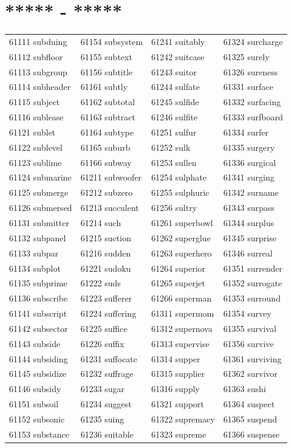 \documentclass[10pt, oneside]{book}
\begin{document}
\begin{table}[h]
	\centering
	\section*{***** - *****}
	\begin{tabular}{l l l l}
61111 subduing &61154 subsystem &61241 suitably &61324 surcharge\\
61112 subfloor &61155 subtext &61242 suitcase &61325 surely\\
61113 subgroup &61156 subtitle &61243 suitor &61326 sureness\\
61114 subheader &61161 subtly &61244 sulfate &61331 surface\\
61115 subject &61162 subtotal &61245 sulfide &61332 surfacing\\
61116 sublease &61163 subtract &61246 sulfite &61333 surfboard\\
61121 sublet &61164 subtype &61251 sulfur &61334 surfer\\
61122 sublevel &61165 suburb &61252 sulk &61335 surgery\\
61123 sublime &61166 subway &61253 sullen &61336 surgical\\
61124 submarine &61211 subwoofer &61254 sulphate &61341 surging\\
61125 submerge &61212 subzero &61255 sulphuric &61342 surname\\
61126 submersed &61213 succulent &61256 sultry &61343 surpass\\
61131 submitter &61214 such &61261 superbowl &61344 surplus\\
61132 subpanel &61215 suction &61262 superglue &61345 surprise\\
61133 subpar &61216 sudden &61263 superhero &61346 surreal\\
61134 subplot &61221 sudoku &61264 superior &61351 surrender\\
61135 subprime &61222 suds &61265 superjet &61352 surrogate\\
61136 subscribe &61223 sufferer &61266 superman &61353 surround\\
61141 subscript &61224 suffering &61311 supermom &61354 survey\\
61142 subsector &61225 suffice &61312 supernova &61355 survival\\
61143 subside &61226 suffix &61313 supervise &61356 survive\\
61144 subsiding &61231 suffocate &61314 supper &61361 surviving\\
61145 subsidize &61232 suffrage &61315 supplier &61362 survivor\\
61146 subsidy &61233 sugar &61316 supply &61363 sushi\\
61151 subsoil &61234 suggest &61321 support &61364 suspect\\
61152 subsonic &61235 suing &61322 supremacy &61365 suspend\\
61153 substance &61236 suitable &61323 supreme &61366 suspense\\
	\end{tabular}
 \end{table}
\end{document}
